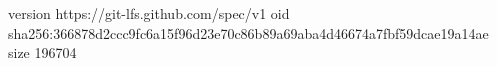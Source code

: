 version https://git-lfs.github.com/spec/v1
oid sha256:366878d2ccc9fc6a15f96d23e70c86b89a69aba4d46674a7fbf59dcae19a14ae
size 196704
